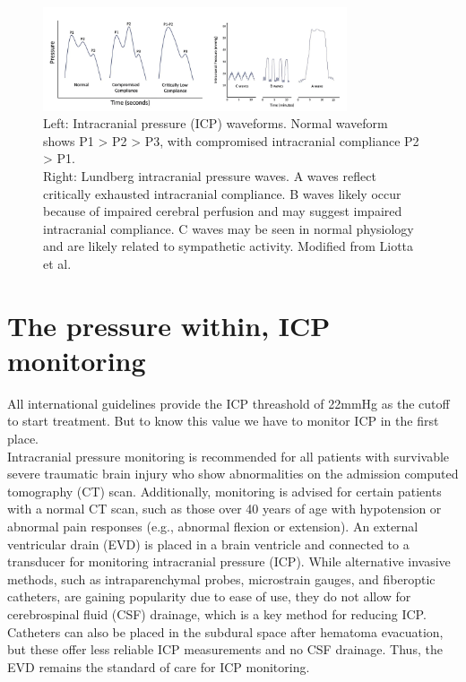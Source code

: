 \begin{figure}[h]
	\centering
	\includegraphics[width=0.8\textwidth]{pictures/fig3.png}
	\caption{Left: Intracranial pressure (ICP) waveforms. Normal waveform shows P1 > P2 > P3, with compromised intracranial compliance P2 > P1. \\ 
		Right: Lundberg intracranial pressure waves. A waves reflect critically exhausted intracranial compliance. B waves likely occur because of impaired cerebral perfusion and may suggest impaired intracranial compliance. C waves may be seen in normal physiology and are likely related to sympathetic activity. Modified from Liotta et al.\cite{liottaManagementCerebralEdema2021}}
\end{figure}


\section[The pressure within, ICP monitoring]{The pressure within, ICP monitoring}
All international guidelines provide the ICP threashold of 22mmHg as the cutoff to start treatment. But to know this value we have to monitor ICP in the first place.\\

 Intracranial pressure monitoring is recommended for all patients with survivable severe traumatic brain injury who show abnormalities on the admission computed tomography (CT) scan. Additionally, monitoring is advised for certain patients with a normal CT scan, such as those over 40 years of age with hypotension or abnormal pain responses (e.g., abnormal flexion or extension).
An external ventricular drain (EVD) is placed in a brain ventricle and connected to a transducer for monitoring intracranial pressure (ICP). While alternative invasive methods, such as intraparenchymal probes, microstrain gauges, and fiberoptic catheters, are gaining popularity due to ease of use, they do not allow for cerebrospinal fluid (CSF) drainage, which is a key method for reducing ICP. Catheters can also be placed in the subdural space after hematoma evacuation, but these offer less reliable ICP measurements and no CSF drainage. Thus, the EVD remains the standard of care for ICP monitoring.

